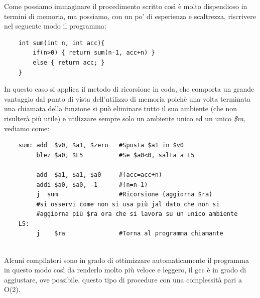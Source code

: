\documentclass[class=book, crop=false]{standalone}
\begin{document}
Come possiamo immaginare il procedimento scritto così è  molto dispendioso in termini di memoria, ma possiamo, con un po' di esperienza e scaltrezza, riscrivere nel seguente modo il programma:

\begin{verbatim}
	int sum(int n, int acc){
		if(n>0) { return sum(n-1, acc+n) }
		else { return acc; }
	}
\end{verbatim}

In questo caso si applica il metodo di ricorsione in coda, che comporta un grande vantaggio dal punto di vista dell'utilizzo di memoria poichè una volta terminata una chiamata della funzione si può eliminare tutto il suo ambiente (che non risulterà più utile) e utilizzare sempre solo un ambiente unico ed un unico \emph{\$ra}, vediamo come:

\begin{verbatim}
	sum: add  $v0, $a1, $zero   #Sposta $a1 in $v0
	     blez $a0, $L5          #Se $a0<0, salta a L5

	     add  $a1, $a1, $a0     #(acc=acc+n)
	     addi $a0, $a0, -1      #(n=n-1)
	     j  sum                 #Ricorsione (aggiorna $ra)
	     #si osservi come non si usa più jal dato che non si
	     #aggiorna più $ra ora che si lavora su un unico ambiente
	L5:
	     j    $ra               #Torna al programma chiamante


\end{verbatim}
Alcuni compilatori sono in grado di ottimizzare automaticamente il programma in questo modo così da renderlo molto più veloce e leggero, il gcc è in grado di aggiustare, ove possibile, questo tipo di procedure con una complessità pari a O(2).\\
\end{document}
